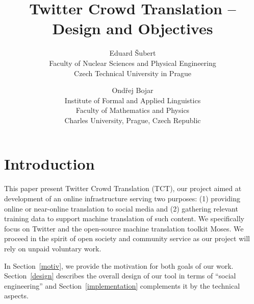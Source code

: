 \documentclass[11pt]{article}
\begin{document}
\title{\textbf{Twitter Crowd Translation -- Design and Objectives}}
\author{
Eduard \v{S}ubert\\
Faculty of Nuclear Sciences and Physical Engineering\\
Czech Technical University in Prague
\and
Ond\v{r}ej Bojar\\
Institute of Formal and Applied Linguistics\\
Faculty of Mathematics and Physics\\
Charles University, Prague, Czech Republic
}

\renewcommand{\today}{June 20, 2014}
\maketitle

\def\footurl#1{\footnote{\tt{} #1}}
\def\equo#1{``#1''}

\def\hashtag#1{\texttt{\##1}}

\def\Sref#1{Section~\ref{#1}}
\def\Fref#1{Figure~\ref{#1}}

\maketitle
%
\section{Introduction}

This paper present Twitter Crowd Translation (TCT), our project aimed at
development of an online infrastructure serving two
purposes:
(1) providing online or near-online translation to social media and (2)
gathering relevant training data to support machine translation of such content.
We specifically focus on Twitter and the open-source machine translation toolkit
Moses. We proceed in the spirit of open society and community service as our
project will rely on unpaid voluntary work.

In \Sref{motiv}, we provide the motivation for both goals of our work.
\Sref{design} describes the overall design of our tool in terms of
\equo{social engineering} and \Sref{implementation} complements it by the
technical aspects.
\end{document}
